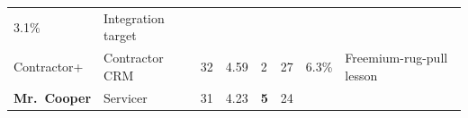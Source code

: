 \documentclass[
  10pt,
]{article}
\begin{document}
\begin{longtable}[]{@{}llllllll@{}}
\begin{minipage}[t]{0.10\columnwidth}
3.1\%\strut
\end{minipage} & \begin{minipage}[t]{0.10\columnwidth}\raggedright
Integration target\strut
\end{minipage}\tabularnewline
\begin{minipage}[t]{0.10\columnwidth}\raggedright
Contractor+\strut
\end{minipage} & \begin{minipage}[t]{0.10\columnwidth}\raggedright
Contractor CRM\strut
\end{minipage} & \begin{minipage}[t]{0.10\columnwidth}\raggedright
32\strut
\end{minipage} & \begin{minipage}[t]{0.10\columnwidth}\raggedright
4.59\strut
\end{minipage} & \begin{minipage}[t]{0.10\columnwidth}\raggedright
2\strut
\end{minipage} & \begin{minipage}[t]{0.10\columnwidth}\raggedright
27\strut
\end{minipage} & \begin{minipage}[t]{0.10\columnwidth}\raggedright
6.3\%\strut
\end{minipage} & \begin{minipage}[t]{0.10\columnwidth}\raggedright
Freemium-rug-pull lesson\strut
\end{minipage}\tabularnewline
\begin{minipage}[t]{0.10\columnwidth}\raggedright
\textbf{Mr.~Cooper}\strut
\end{minipage} & \begin{minipage}[t]{0.10\columnwidth}\raggedright
Servicer\strut
\end{minipage} & \begin{minipage}[t]{0.10\columnwidth}\raggedright
31\strut
\end{minipage} & \begin{minipage}[t]{0.10\columnwidth}\raggedright
4.23\strut
\end{minipage} & \begin{minipage}[t]{0.10\columnwidth}\raggedright
\textbf{5}\strut
\end{minipage} & \begin{minipage}[t]{0.10\columnwidth}\raggedright
24\strut
\end{minipage} & \begin{minipage}[t]{0.10\columnwidth}\raggedright

\end{minipage}
\end{longtable}
\end{document}
